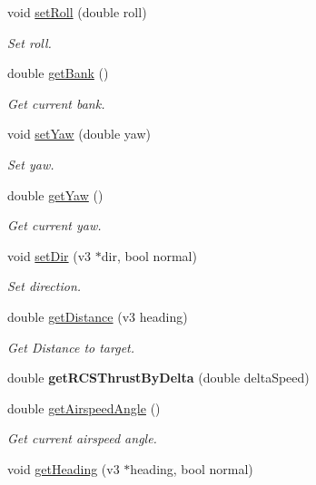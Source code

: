 \begin{DoxyCompactItemize}
void \mbox{\hyperlink{classNavAP_af1fbe1959b0b1b3929021a11181aa782}{set\+Roll}} (double roll)
\begin{DoxyCompactList}\small\item\em Set roll. \end{DoxyCompactList}\item 
double \mbox{\hyperlink{classNavAP_ab8f7ea8be6de98ec19090322e7920325}{get\+Bank}} ()
\begin{DoxyCompactList}\small\item\em Get current bank. \end{DoxyCompactList}\item 
void \mbox{\hyperlink{classNavAP_a6f935cc2ad075ffa1eaffc8814a2d29e}{set\+Yaw}} (double yaw)
\begin{DoxyCompactList}\small\item\em Set yaw. \end{DoxyCompactList}\item 
double \mbox{\hyperlink{classNavAP_a121eed90683e2fd3b0d55cc0ed707b5e}{get\+Yaw}} ()
\begin{DoxyCompactList}\small\item\em Get current yaw. \end{DoxyCompactList}\item 
void \mbox{\hyperlink{classNavAP_a1d6a18580cbdbb3b9c61a18b4cfee337}{set\+Dir}} (v3 $\ast$dir, bool normal)
\begin{DoxyCompactList}\small\item\em Set direction. \end{DoxyCompactList}\item 
double \mbox{\hyperlink{classNavAP_a1b215919d2892861653411bdfd9c0737}{get\+Distance}} (v3 heading)
\begin{DoxyCompactList}\small\item\em Get Distance to target. \end{DoxyCompactList}\item 
\mbox{\label{classNavAP_a4e5947082882a3e8f24097e9bc090e1b}} 
double {\bfseries get\+R\+C\+S\+Thrust\+By\+Delta} (double delta\+Speed)
\item 
double \mbox{\hyperlink{classNavAP_abd22bda1a2e7e2b1048caf4c42c1d4b0}{get\+Airspeed\+Angle}} ()
\begin{DoxyCompactList}\small\item\em Get current airspeed angle. \end{DoxyCompactList}\item 
void \mbox{\hyperlink{classNavAP_ab9ef70ad4fe6f4eaed5e03e421bacdf2}{get\+Heading}} (v3 $\ast$heading, bool normal)

\end{DoxyCompactItemize}
